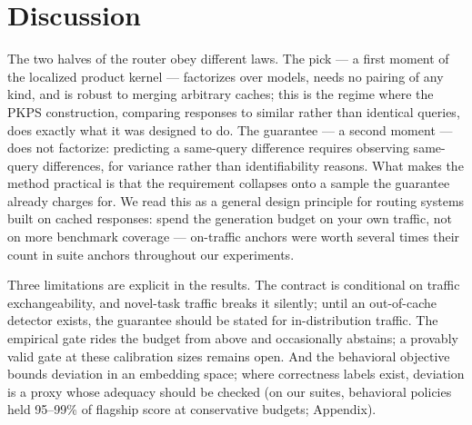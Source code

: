 \documentclass{article}
\newcommand{\PKPS}{PKPS\xspace}
\begin{document}
\section{Discussion}

The two halves of the router obey different laws. The pick --- a first
moment of the localized product kernel --- factorizes over models, needs
no pairing of any kind, and is robust to merging arbitrary caches; this is
the regime where the \PKPS construction, comparing responses to similar
rather than identical queries, does exactly what it was designed to do.
The guarantee --- a second moment --- does not factorize: predicting a
same-query difference requires observing same-query differences, for
variance rather than identifiability reasons. What makes the method
practical is that the requirement collapses onto a sample the guarantee
already charges for. We read this as a general design principle for
routing systems built on cached responses: spend the generation budget on
your own traffic, not on more benchmark coverage --- on-traffic anchors
were worth several times their count in suite anchors throughout our
experiments.

Three limitations are explicit in the results. The contract is conditional
on traffic exchangeability, and novel-task traffic breaks it silently;
until an out-of-cache detector exists, the guarantee should be stated for
in-distribution traffic. The empirical gate rides the budget from above
and occasionally abstains; a provably valid gate at these calibration
sizes remains open. And the behavioral objective bounds deviation in an
embedding space; where correctness labels exist, deviation is a proxy
whose adequacy should be checked (on our suites, behavioral policies held
95--99\% of flagship score at conservative budgets; Appendix).
\end{document}
